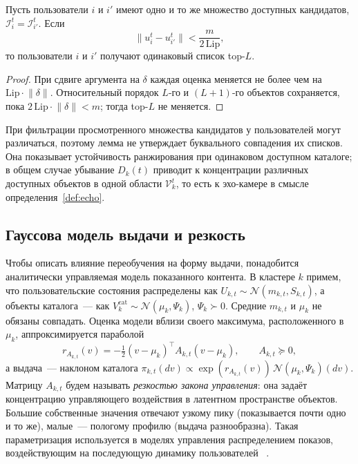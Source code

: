 \begin{lemma}
\label{lem:margin}
Пусть пользователи $i$ и $i'$ имеют одно и то же множество доступных кандидатов,
$\mathcal I_i^t=\mathcal I_{i'}^t$. Если
\[
    \lVert u_i^t-u_{i'}^t\rVert<\frac{m}{2\,\mathrm{Lip}},
\]
то пользователи $i$ и $i'$ получают одинаковый список top-$L$.
\end{lemma}

\begin{proof}
При сдвиге аргумента на $\delta$ каждая оценка меняется
не более чем на $\mathrm{Lip}\cdot\lVert\delta\rVert$. Относительный порядок
$L$-го и $(L{+}1)$-го объектов сохраняется, пока
$2\,\mathrm{Lip}\cdot\lVert\delta\rVert<m$; тогда top-$L$ не меняется.
\end{proof}

При фильтрации просмотренного множества кандидатов у пользователей могут
различаться, поэтому лемма не утверждает буквального совпадения их списков. Она
показывает устойчивость ранжирования при одинаковом доступном каталоге; в общем
случае убывание $D_k(t)$ приводит к концентрации различных доступных объектов в
одной области $\mathcal V_k^t$, то есть к эхо-камере в смысле
определения~\ref{def:echo}.

\subsection{Гауссова модель выдачи и резкость}
\label{subsec:gaussian_serving}

Чтобы описать влияние переобучения на форму выдачи, понадобится аналитически
управляемая модель показанного контента. В кластере $k$ примем, что
пользовательские состояния распределены как
$U_{k,t}\sim\mathcal N(m_{k,t},S_{k,t})$, а объекты каталога~--- как
$V_k^{\mathrm{cat}}\sim\mathcal N(\mu_k,\Psi_k)$, $\Psi_k\succ0$. Средние
$m_{k,t}$ и $\mu_k$ не обязаны совпадать. Оценка модели вблизи своего максимума,
расположенного в $\mu_k$, аппроксимируется параболой
\begin{equation}
    r_{A_{k,t}}(v) = -\tfrac12(v-\mu_k)^\top A_{k,t}(v-\mu_k),
    \qquad A_{k,t}\succeq0,
    \label{eq:quad_score}
\end{equation}
а выдача~--- наклоном каталога $\pi_{k,t}(dv)\propto\exp(r_{A_{k,t}}(v))\,
\mathcal N(\mu_k,\Psi_k)(dv)$. Матрицу $A_{k,t}$ будем называть
\emph{резкостью закона управления}: она задаёт концентрацию управляющего
воздействия в латентном пространстве объектов. Большие собственные значения
отвечают узкому пику (показывается почти одно и то же), малые~--- пологому
профилю (выдача разнообразна). Такая параметризация используется в моделях
управления распределением показов, воздействующим на последующую динамику
пользователей
~\cite{depasquale2026controlSystems, sprenger2024controlStrategies}.


